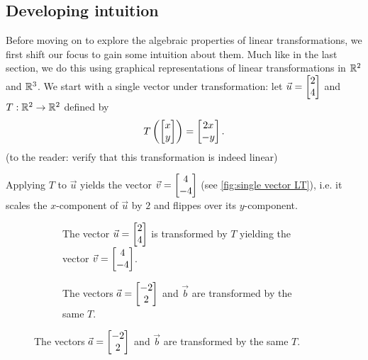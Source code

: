 \subsection{Developing intuition}
Before moving on to explore the algebraic properties of linear transformations, we first shift our focus to gain some intuition about them. Much like in the last section, we do this using graphical representations of linear transformations in $\mathbb{R}^{2}$ and $\mathbb{R}^{3}$. We start with a single vector under transformation: let $\vec{u}=\colvec{2;4}$ and $T:\mathbb{R}^{2}\to\mathbb{R}^{2}$ defined by
\begin{equation}
	T\left( \colvec{x;y} \right) = \colvec{2x;-y}.
\end{equation}
(to the reader: verify that this transformation is indeed linear)

Applying $T$ to $\vec{u}$ yields the vector $\vec{v}=\colvec{4;-4}$ (see \autoref{fig:single vector LT}), i.e. it scales the $x$-component of $\vec{u}$ by $2$ and flippes over its $y$-component.

\begin{figure}
	\centering
	\begin{subfigure}[t]{0.45\textwidth}
		\caption{The vector $\vec{u}=\colvec{2;4}$ is transformed by $T$ yielding the vector $\vec{v}=\colvec{4;-4}$.}
		\label{fig:single vector LT}
	\end{subfigure}
	\hfill
	\begin{subfigure}[t]{0.45\textwidth}
		\centering
		\caption{The vectors $\vec{a}=\colvec{-2;2}$ and $\vec{b}$ are transformed by the same $T$.}
		\label{fig:two vectors LT}
	\end{subfigure}
\end{figure}

